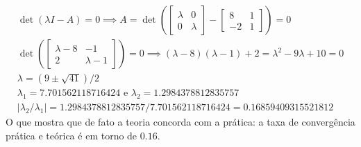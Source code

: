 \documentclass[a4paper,11pt]{article}
\begin{document}
        $$
        \begin{matrix}
            \det(\lambda I - A) = 0 \implies A = \det \left (
            \begin{bmatrix}
                \lambda & 0 \\
                0 & \lambda
            \end{bmatrix}
            -
            \begin{bmatrix}
                8 & 1 \\
                -2 & 1
            \end{bmatrix}
            \right ) = 0
            \\
            \det \left (
            \begin{bmatrix}
                \lambda - 8 & -1 \\
                2 & \lambda - 1
            \end{bmatrix} 
            \right ) = 0
            \implies (\lambda - 8)(\lambda - 1) + 2 = \lambda^2 - 9 \lambda + 10 = 0
            \\
            \lambda = (9 \pm \sqrt{41})/2
            \\
            \lambda_1 = 7.701562118716424 \text{ e } \lambda_2 = 1.2984378812835757
            \\
            |\lambda_2/\lambda_1| = 1.2984378812835757/7.701562118716424 = 0.16859409315521812
        \end{matrix}
        $$
        O que mostra que de fato a teoria concorda com a prática: a taxa de convergência prática e teórica é em torno de $0.16$.
\end{document}
